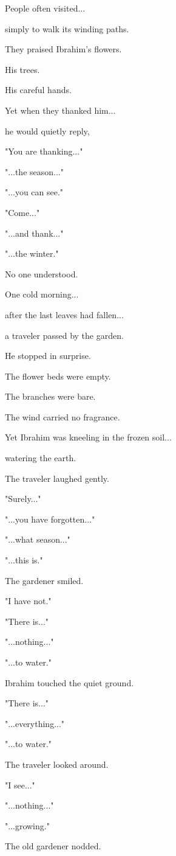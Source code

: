 \documentclass[12pt,openany]{book}
\begin{document}
People often visited...

simply to walk its winding paths.

They praised Ibrahim's flowers.

His trees.

His careful hands.

Yet when they thanked him...

he would quietly reply,

"You are thanking..."

"...the season..."

"...you can see."

"Come..."

"...and thank..."

"...the winter."

No one understood.

One cold morning...

after the last leaves had fallen...

a traveler passed by the garden.

He stopped in surprise.

The flower beds were empty.

The branches were bare.

The wind carried no fragrance.

Yet Ibrahim was kneeling in the frozen soil...

watering the earth.

The traveler laughed gently.

"Surely..."

"...you have forgotten..."

"...what season..."

"...this is."

The gardener smiled.

"I have not."

"There is..."

"...nothing..."

"...to water."

Ibrahim touched the quiet ground.

"There is..."

"...everything..."

"...to water."

The traveler looked around.

"I see..."

"...nothing..."

"...growing."

The old gardener nodded.
\end{document}
